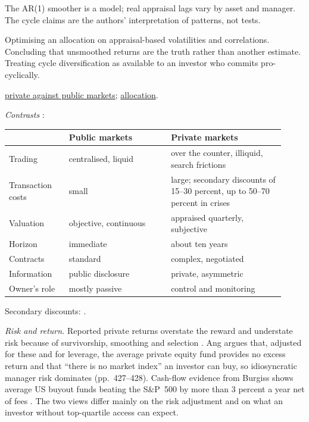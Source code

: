\begin{qfmethod}
 The AR(1) smoother is a model; real appraisal lags vary by asset and manager. The cycle claims are the authors' interpretation of patterns, not tests.

 Optimising an allocation on appraisal-based volatilities and correlations. Concluding that unsmoothed returns are the truth rather than another estimate. Treating cycle diversification as available to an investor who commits pro-cyclically.

 \hyperref[meth:private-public-market-comparison]{private against public markets}; \hyperref[meth:alternatives-allocation-approaches]{allocation}.

\end{qfmethod}

\begin{qfmethod}\label{meth:private-public-market-comparison}
 \emph{Contrasts} \citep[p.~594, Table~18.1]{s7-ang}:
\begin{center}\small
\begin{tabular}{@{}p{0.2\linewidth}p{0.34\linewidth}p{0.38\linewidth}@{}}
\toprule
 & Public markets & Private markets \\
\midrule
Trading & centralised, liquid & over the counter, illiquid, search frictions \\
Transaction costs & small & large; secondary discounts of 15--30 percent, up to 50--70 percent in crises \\
Valuation & objective, continuous & appraised quarterly, subjective \\
Horizon & immediate & about ten years \\
Contracts & standard & complex, negotiated \\
Information & public disclosure & private, asymmetric \\
Owner's role & mostly passive & control and monitoring \\
\bottomrule
\end{tabular}
\end{center}
Secondary discounts: \citep[p.~63]{demaria-private-markets-2021}.

\emph{Risk and return.} Reported private returns overstate the reward and understate risk because of survivorship, smoothing and selection \citep[pp.~416--426]{s7-ang}. Ang argues that, adjusted for these and for leverage, the average private equity fund provides no excess return and that ``there is no market index'' an investor can buy, so idiosyncratic manager risk dominates (pp.~427--428). Cash-flow evidence from Burgiss shows average US buyout funds beating the S\&P~500 by more than 3 percent a year net of fees \citep[abstract]{pe-harris-jenkinson-kaplan-2014}. The two views differ mainly on the risk adjustment and on what an investor without top-quartile access can expect.


\end{qfmethod}
